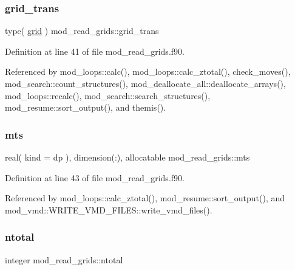 \subsubsection{\texorpdfstring{grid\+\_\+trans}{grid\_trans}}
{\footnotesize\ttfamily type( \hyperlink{structmod__read__grids_1_1grid}{grid} ) mod\+\_\+read\+\_\+grids\+::grid\+\_\+trans}



Definition at line 41 of file mod\+\_\+read\+\_\+grids.\+f90.



Referenced by mod\+\_\+loops\+::calc(), mod\+\_\+loops\+::calc\+\_\+ztotal(), check\+\_\+moves(), mod\+\_\+search\+::count\+\_\+structures(), mod\+\_\+deallocate\+\_\+all\+::deallocate\+\_\+arrays(), mod\+\_\+loops\+::recalc(), mod\+\_\+search\+::search\+\_\+structures(), mod\+\_\+resume\+::sort\+\_\+output(), and themis().

\mbox{\label{namespacemod__read__grids_af619057af0e7ce4717a95d4239422912}} 
\subsubsection{\texorpdfstring{mts}{mts}}
{\footnotesize\ttfamily real( kind = dp ), dimension(\+:), allocatable mod\+\_\+read\+\_\+grids\+::mts}



Definition at line 43 of file mod\+\_\+read\+\_\+grids.\+f90.



Referenced by mod\+\_\+loops\+::calc\+\_\+ztotal(), mod\+\_\+resume\+::sort\+\_\+output(), and mod\+\_\+vmd\+::\+W\+R\+I\+T\+E\+\_\+\+V\+M\+D\+\_\+\+F\+I\+L\+E\+S\+::write\+\_\+vmd\+\_\+files().

\mbox{\label{namespacemod__read__grids_aa54b9eaa554b8519d41c5e616479d343}} 
\subsubsection{\texorpdfstring{ntotal}{ntotal}}
{\footnotesize\ttfamily integer mod\+\_\+read\+\_\+grids\+::ntotal}



